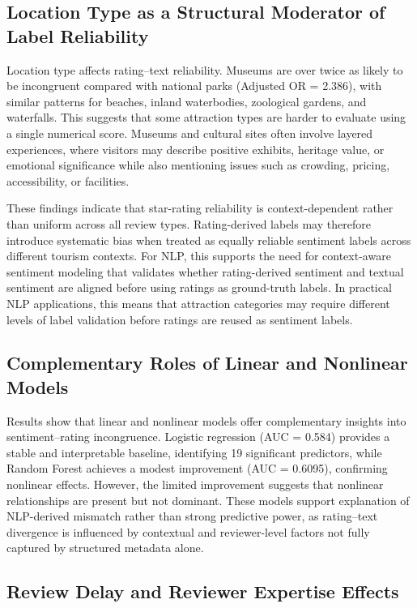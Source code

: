 \documentclass[conference]{IEEEtran}
\begin{document}
\subsection{Location Type as a Structural Moderator of Label Reliability}
Location type affects rating–text reliability. Museums are over twice as likely to be incongruent compared with national parks (Adjusted OR = 2.386), with similar patterns for beaches, inland waterbodies, zoological gardens, and waterfalls. This suggests that some attraction types are harder to evaluate using a single numerical score. Museums and cultural sites often involve layered experiences, where visitors may describe positive exhibits, heritage value, or emotional significance while also mentioning issues such as crowding, pricing, accessibility, or facilities.

These findings indicate that star-rating reliability is context-dependent rather than uniform across all review types. Rating-derived labels may therefore introduce systematic bias when treated as equally reliable sentiment labels across different tourism contexts. For NLP, this supports the need for context-aware sentiment modeling that validates whether rating-derived sentiment and textual sentiment are aligned before using ratings as ground-truth labels. In practical NLP applications, this means that attraction categories may require different levels of label validation before ratings are reused as sentiment labels.

\subsection{Complementary Roles of Linear and Nonlinear Models}
Results show that linear and nonlinear models offer complementary insights into sentiment–rating incongruence. Logistic regression (AUC = 0.584) provides a stable and interpretable baseline, identifying 19 significant predictors, while Random Forest achieves a modest improvement (AUC = 0.6095), confirming nonlinear effects. However, the limited improvement suggests that nonlinear relationships are present but not dominant. These models support explanation of NLP-derived mismatch rather than strong predictive power, as rating–text divergence is influenced by contextual and reviewer-level factors not fully captured by structured metadata alone.


\subsection{Review Delay and Reviewer Expertise Effects}
\end{document}
